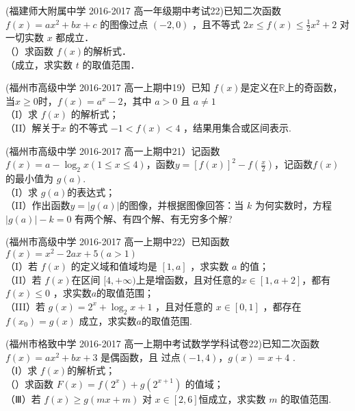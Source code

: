 (福建师大附属中学 2016-2017 高一年级期中考试22)已知二次函数 $f ( x )= ax^2+ bx+ c$ 的图像过点 $(-2,0)$ ，且不等式 $2 x\leq f ( x )\leq \frac12x^2+ 2$ 对一切实数 $x$ 都成立．\\
（）求函数 $f ( x ) $的解析式． \\
（成立，求实数 $t$ 的取值范围．


(福州市高级中学 2016-2017 高一上期中19）已知 $f(x)$是定义在$\mathbb{R}$上的奇函数，当$x\geq0$时，$f(x)=a^x-2$，其中 $a> 0$ 且 $a\neq 1$\\
（I）求 $f (x )$ 的解析式；\\
（II）解关于$x$ 的不等式 $-1< f(x)<4$ ，结果用集合或区间表示.


(福州市高级中学 2016-2017 高一上期中21）记函数 $f (x )=a-\log_2{x}(1\leq x\leq 4)$，函数$y=[f(x)]^2-f(\frac x2)$，记函数$f(x)$ 的最小值为 $g( a)$.\\
（I）求 $g( a) $的表达式；\\
（II）作出函数$y=|g(a)|$的图像，并根据图像回答：当 $k$ 为何实数时，方程$|g( a)|-k=0$ 有两个解、有四个解、有无穷多个解?

(福州市高级中学 2016-2017 高一上期中22）已知函数$f(x)=x^2-2ax+5(a>1)$\\
（I）若 $f (x )$ 的定义域和值域均是 $[1, a]$ ，求实数 $a$ 的值； \\
（II）若 $f (x ) $在区间 $[4,+\infty)$上是增函数，且对任意的$ x \in[1, a+ 2]$，都有 $f( x )\leq 0$ ，求实数$a$的取值范围；\\
（III）若 $g( x )=2^x+\log_2{x+ 1 }$ ，且对任意的 $x \in[0,1]$ ，都存在$f(x_0)=g(x)$ 成立，求实数$a$的取值范围.


(福州市格致中学 2016-2017 高一上期中考试数学学科试卷22)已知二次函数 $f ( x )= ax^2+ bx+3$ 是偶函数，且 过点$(-1,4)$，$ g ( x )= x + 4$ .\\
（Ⅰ）求 $f (x) $的解析式；\\
（）求函数 $F ( x )= f (2^x )+ g (2^{x+1} )$ 的值域； \\
（Ⅲ）若 $f ( x ) \geq g ( mx +m )$ 对 $x\in [2, 6] $恒成立，求实数 $m$ 的取值范围.
